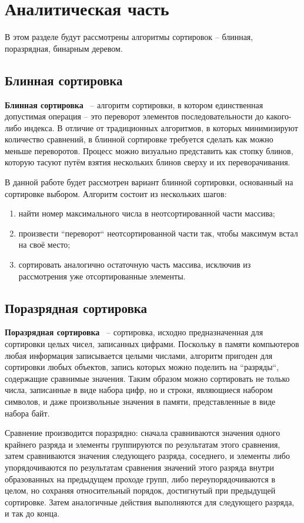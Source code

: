 \chapter{Аналитическая часть}
В этом разделе будут рассмотрены алгоритмы сортировок -- блинная, поразрядная, бинарным деревом.

\section{Блинная сортировка}
\textbf{Блинная сортировка}~\cite{pancake-sort}  -- алгоритм сортировки, в котором единственная допустимая операция -- это переворот элементов последовательности до какого-либо индекса. В отличие от традиционных алгоритмов, в которых минимизируют количество сравнений, в блинной сортировке требуется сделать как можно меньше переворотов. Процесс можно визуально представить как стопку блинов, которую тасуют путём взятия нескольких блинов сверху и их переворачивания.

В данной работе будет рассмотрен вариант блинной сортировки, основанный на сортировке выбором.
Алгоритм состоит из нескольких шагов:
\begin{enumerate}[label=\arabic*)]
	\item найти номер максимального числа в неотсортированной части массива;
	\item произвести ``переворот`` неотсортированной части так, чтобы максимум встал на своё место;
	\item сортировать аналогично остаточную часть массива, исключив из рассмотрения уже отсортированные элементы.
\end{enumerate}

\section{Поразрядная сортировка}
\textbf{Поразрядная сортировка}~\cite{radix-sort}  -- сортировка, исходно предназначенная для сортировки целых чисел, записанных цифрами. 
Поскольку в памяти компьютеров любая информация записывается целыми числами, алгоритм пригоден для сортировки любых объектов, запись которых можно поделить на ``разряды``, содержащие сравнимые значения. 
Таким образом можно сортировать не только числа, записанные в виде набора цифр, но и строки, являющиеся набором символов, и даже произвольные значения в памяти, представленные в виде набора байт.


Сравнение производится поразрядно: сначала сравниваются значения одного крайнего разряда и элементы группируются по результатам этого сравнения, затем сравниваются значения следующего разряда, соседнего, и элементы либо упорядочиваются по результатам сравнения значений этого разряда внутри образованных на предыдущем проходе групп, либо переупорядочиваются в целом, но сохраняя относительный порядок, достигнутый при предыдущей сортировке. Затем аналогичные действия выполняются для следующего разряда, и так до конца.


